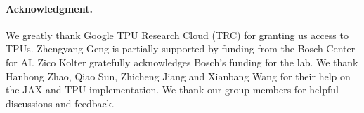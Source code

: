 
\vspace{2em}
\paragraph{Acknowledgment.}
We greatly thank Google TPU Research Cloud (TRC) for granting us access to TPUs.
Zhengyang Geng is partially supported by funding from the Bosch Center for AI. Zico Kolter gratefully acknowledges Bosch’s funding for the lab.
We thank Hanhong Zhao, Qiao Sun, Zhicheng Jiang and Xianbang Wang for their help on the JAX and TPU implementation. We thank our group members for helpful discussions and feedback.